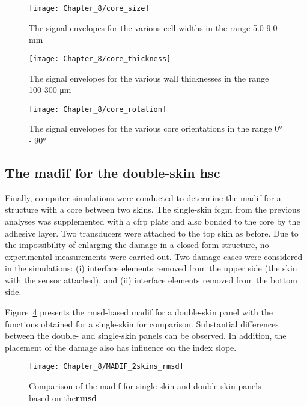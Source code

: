 \documentclass[11pt,a4paper,final]{report}
\theoremstyle{plain}
\begin{document}
\begin{figure}[!htb]
	\begin{center}
		\texttt{[image: Chapter\_8/core\_size]}
	\end{center}
	\caption{The signal envelopes for the various cell widths in the range 5.0-9.0 \unit{\mm}}
	\label{fig:core_size}
\end{figure}

\begin{figure}[!htb]
	\begin{center}
		\texttt{[image: Chapter\_8/core\_thickness]}
	\end{center}
	\caption{The signal envelopes for the various wall thicknesses in the range 100-300 \unit{\micro\m}}
	\label{fig:core_thickness}
\end{figure}

\begin{figure}[!htb]
	\begin{center}
		\texttt{[image: Chapter\_8/core\_rotation]}
	\end{center}
	\caption{The signal envelopes for the various core orientations in the range \ang{0} - \ang{90}}
	\label{fig:core_rotation}
\end{figure}
\clearpage
\subsection{The \acl{madif} for the double-skin \acl{hsc}}

Finally, computer simulations were conducted to determine the \ac{madif} for a structure with a core between two skins.
The single-skin \ac{fcgm} from the previous analyses was supplemented with a \ac{cfrp} plate and also bonded to the core by the adhesive layer.
Two transducers were attached to the top skin as before.
Due to the impossibility of enlarging the damage in a closed-form structure, no experimental measurements were carried out.
Two damage cases were considered in the simulations: (i) interface elements removed from the upper side (the skin with the sensor attached), and (ii) interface elements removed from the bottom side.

Figure~\ref{fig:madif_2skins_rmsd} presents the \ac{rmsd}-based \ac{madif} for a double-skin panel with the functions obtained for a single-skin for comparison.
Substantial differences between the double- and single-skin panels can be observed.
In addition, the placement of the damage also has influence on the index slope.
\begin{figure}[!htb]
	\begin{center}
		\texttt{[image: Chapter\_8/MADIF\_2skins\_rmsd]}
	\end{center}
	\caption{Comparison of the \acl{madif} for single-skin and double-skin panels based on the\textbf{\acf{rmsd}}}
	\label{fig:madif_2skins_rmsd}
\end{figure}
\end{document}
